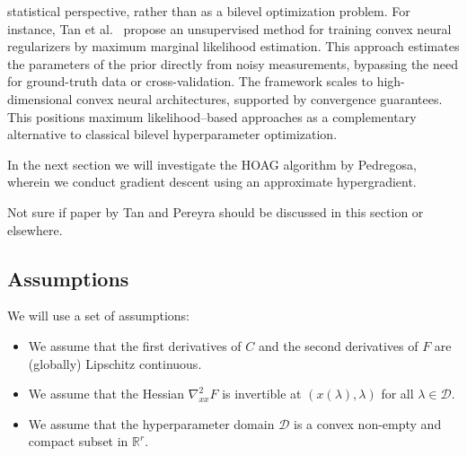\documentclass[11pt, twoside]{report}
\begin{document}
statistical perspective, rather than as a bilevel optimization problem. For instance, Tan et al.~\cite{tan2024unsupervised} propose an unsupervised method for training convex neural regularizers by maximum marginal likelihood estimation. This approach estimates the parameters of the prior directly from noisy measurements, bypassing the need for ground-truth data or cross-validation. The framework scales to high-dimensional convex neural architectures, supported by convergence guarantees. This positions maximum likelihood--based approaches as a complementary alternative to classical bilevel hyperparameter optimization.

In the next section we will investigate the HOAG algorithm by Pedregosa, wherein we conduct gradient descent using an approximate hypergradient.

\begin{mdframed}[hidealllines=true,backgroundcolor=yellow!20]
    Not sure if paper by Tan and Pereyra \cite{tan2024unsupervised} should be discussed in this section or elsewhere.
\end{mdframed}



\subsection{Assumptions}
We will use a set of assumptions:
\begin{itemize}
    \item We assume that the first derivatives of $C$ and the second derivatives of $F$ are (globally) Lipschitz continuous.
    \item We assume that the Hessian $\nabla_{xx}^2 F$ is invertible at $(x(\lambda),\lambda)$ for all $\lambda \in \mathcal{D}$.
    \item We assume that the hyperparameter domain $\mathcal{D}$ is a convex non-empty and compact subset in $\mathbb{R}^r$.
\end{itemize}

\end{document}
